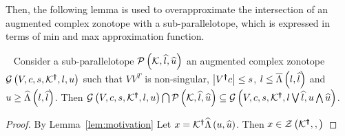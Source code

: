 Then, the following lemma is used to overapproximate the intersection
of an augmented complex zonotope with a sub-parallelotope, which is
expressed in terms of min and max approximation function.
\begin{theorem}~\label{lem:acz-int}
Consider a sub-parallelotope $\mathcal{P}\left(\mathcal{K},\widehat{l},\widehat{u}\right)$ an
augmented complex zonotope $\mathcal{G}\left(V,c,s,\mathcal{K}^{\bm{\dagger}},l,u\right)$
such that $VV^T$ is non-singular, $\left|V^{\bm{\dagger}}c\right|\leq s$, $l\leq
\overline{\Lambda}\left(l,\widehat{l}\right)$ and $u\geq \widehat{\Lambda}\left(l,\widehat{l}\right)$.  Then
$\mathcal{G}\left(V,c,s,\mathcal{K}^{\bm{\dagger}},l,u\right)\bigcap\mathcal{P}\left(\mathcal{K},\widehat{l},\widehat{u}\right)\subseteq
\mathcal{G}\left(V,c,s,\mathcal{K}^{\bm{\dagger}},l\bigvee\widehat{l},u\bigwedge\widehat{u}\right)$.
\end{theorem}
\begin{proof}
By Lemma~\ref{lem:motivation}
Let $x = \mathcal{K}^{\bm{\dagger}}\widehat{\Lambda}\left(u,\widehat{u}\right)$.  Then $x\in\mathcal{Z}\left(\mathcal{K}^{\bm{\dagger}},,\right)$
\end{proof}
%
